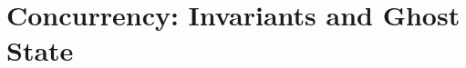 \section{Concurrency: Invariants and Ghost State}
\label{sec:invar-ghost-state}

\newcommand{\invtypingrule}
{\infer{
    \vctx \proves \wtt{\prop}{\Prop} \and
    \vctx \proves \wtt{\iname}{\textlog{InvName}}
  }{
    \vctx \proves \wtt{\knowInv{\iname}{\prop}}{\Prop}
}}
\newcommand{\htmaskweakenrule}[1][]
{\rulegen[#1]{Ht-mask-weaken}
  {S \proves \hoare{P}{e}{v.Q}[\mask_1] \and \mask_1 \subseteq \mask_2}
  {S \proves \hoare{P}{e}{v.Q}[\mask_2]}}
\newcommand{\invpersrule}[1][]
{\rulegen[#1]{Inv-persistent}
{ }
{\knowInv{\iota}{P} \proves \persistently \knowInv{\iota}{P}}}
\newcommand{\htinvallocrule}[1][]
{\rulegen[#1]{Ht-inv-alloc}
{\mathcal{E}\ \infinite \and S \land \Exists \iota \in \mathcal{E}.\knowInv{\iota}{P} \proves \hoare{Q}{e}{v.R}[\mathcal{E}]}
{S \proves \hoare{\later P \ast Q}{e}{v.R}[\mathcal{E}]}}
\newcommand{\htinvopenrule}[1][]
{\rulegen[#1]{Ht-inv-open}
{e \text{ is an atomic expression} \and S \land\knowInv{\iota}{P} \proves \hoare{\later P \ast Q}{e}{v.\later P \ast R}[\mathcal{E}]}
                       {S \land \knowInv{\iota}{P} \proves \hoare{Q}{e}{v.R}[\mathcal{E} \uplus \{\iota\}]}
}
\newcommand{\htframeatomicrule}[1][]
{\rulegen[#1]{Ht-frame-atomic}
  {e \text{ is an atomic expression} \and S \proves \hoare{P}{e}{v.Q}}
  {S \proves \hoare{P \ast \later R}{e}{v.Q \ast R}}}
\newcommand{\htlaterfalserule}[1][]
{\rulegen[#1]{Ht-later-false}
        { e \text{ is an atomic expression} }
        { \hoare{\later(\FALSE)}{e}{v.Q}}}

\newcommand{\coretypingrule}
{\infer
  {\Gamma \proves \wtt{a}{\Ml_i} \and \mcore{a}_i \text{ defined }}
  {\Gamma \proves \wtt{\mcore{a}_i}{\Ml_i}}}
\newcommand{\validtypingrule}
{\infer
  {\Gamma \proves \wtt{a}{\Ml_i}}
  {\Gamma \proves \wtt{a \in \Vl_i}{\Prop}}}
\newcommand{\owntypingrule}
{\infer
  {\gamma \in \textlog{GhostName} \and \Gamma \proves \wtt{a}{\Ml_i}}
  {\Gamma \proves \wtt{\ownGhost{\gamma}{a : \Ml_i}}{\Prop} }}

\newcommand{\updtypingrule}
{\infer
  {\Gamma \proves \wtt{P}{\Prop}}
  {\Gamma \proves \wtt{\pvs P}{\Prop}}}
\newcommand{\updmonorule}[1][]
{\rulegen[#1]{upd-mono}
  {P \proves Q}
  {\pvs P \proves \pvs Q}}
\newcommand{\updintrorule}[1][]
{\rulegen[#1]{upd-intro}{ }
  {P \proves \pvs P}}
\newcommand{\updidemprule}[1][]
{\rulegen[#1]{upd-idemp}
  { }
  {\pvs \pvs P \proves \pvs P}}
\newcommand{\updframerule}[1][]
{\rulegen[#1]{upd-frame}
  { }
  {P \ast \pvs Q \proves \pvs (P \ast Q)}}


